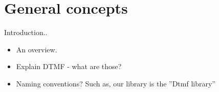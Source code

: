 \chapter{General concepts}\label{chap:general}
Introduction..
\begin{itemize}
 \item An overview.
 \item Explain DTMF - what are those?
 \item Naming conventions? Such as, our library is the ''Dtmf library''
\end{itemize}

